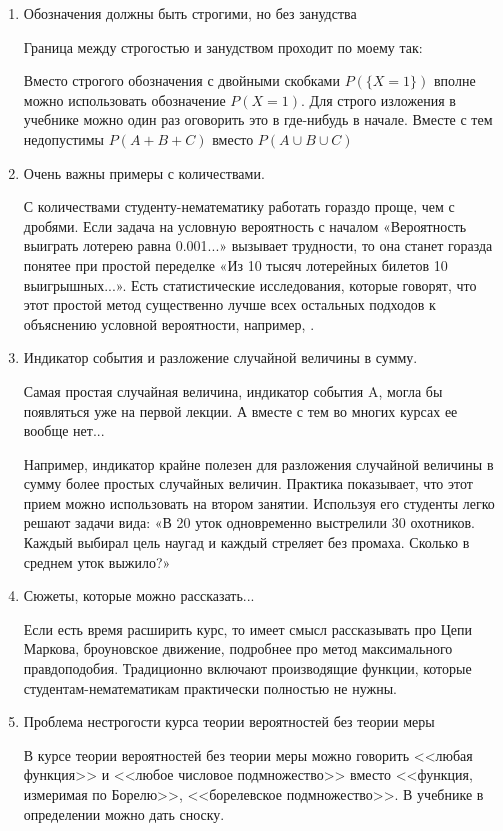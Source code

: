 \documentclass[pdftex,12pt,a4paper]{article}
\begin{document}
\begin{enumerate}
\item Обозначения должны быть строгими, но без занудства

Граница между строгостью и занудством проходит по моему так:

Вместо строгого обозначения с двойными скобками $P(\{X=1\})$ вполне можно использовать обозначение $P(X=1)$. Для строго изложения в учебнике можно один раз оговорить это в где-нибудь в начале.
Вместе с тем недопустимы $P(A+B+C)$ вместо $P(A\cup B\cup C)$


\item Очень важны примеры с количествами.

С количествами студенту-нематематику работать гораздо проще, чем с дробями. Если задача на условную вероятность с началом  «Вероятность выиграть лотерею равна 0.001...» вызывает трудности, то она станет горазда понятее при простой переделке «Из 10 тысяч лотерейных билетов 10 выигрышных...». Есть статистические исследования, которые говорят, что этот простой метод существенно лучше всех остальных подходов к объяснению условной вероятности, например, \cite{sedlmeier:bayesian_reasoning}.

\item Индикатор события и разложение случайной величины в сумму.

Самая простая случайная величина, индикатор события A, могла бы появляться уже на первой лекции. А вместе с тем во многих курсах ее вообще нет... 

Например, индикатор крайне полезен для  разложения случайной величины в сумму более простых случайных величин. Практика показывает, что этот прием можно использовать на втором занятии. Используя его студенты легко решают задачи вида: «В 20 уток одновременно выстрелили 30 охотников. Каждый выбирал цель наугад и каждый стреляет без промаха. Сколько в среднем уток выжило?»

\item Сюжеты, которые можно рассказать...

Если есть время расширить курс, то имеет смысл рассказывать про Цепи Маркова, броуновское движение, подробнее про метод максимального правдоподобия. Традиционно включают производящие функции, которые студентам-нематематикам практически полностью не нужны. 

\item Проблема нестрогости курса теории вероятностей без теории меры

В курсе теории вероятностей без теории меры можно говорить <<любая функция>> и <<любое числовое подмножество>> вместо <<функция, измеримая по Борелю>>, <<борелевское подмножество>>. В учебнике в определении можно дать сноску. 


\end{enumerate}
\end{document}
